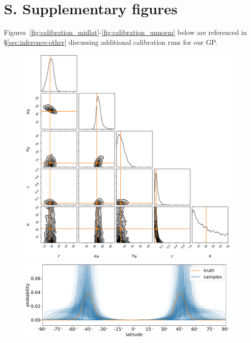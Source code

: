 \documentclass[modern,linenumbers]{aastex62}
\begin{document}
%
%
%
%
%
%

\clearpage
\pagebreak
\vspace*{\fill}
\section*{S. Supplementary figures}
%
Figures~\ref{fig:calibration_midlat}-\ref{fig:calibration_unnorm} below
are referenced in \S\ref{sec:inference-other} discussing additional
calibration runs for our GP.
\vspace*{\fill}
\clearpage
\pagebreak

\renewcommand{\thefigure}{S\arabic{figure}}

\begin{figure}[p!]
    \begin{centering}
        \includegraphics[width=\linewidth]{figures/calibration_midlat_corner.pdf}
        \\[1em]
        \includegraphics[width=\linewidth]{figures/calibration_midlat_latitude.pdf}
    \end{centering}
\end{figure}
\end{document}
